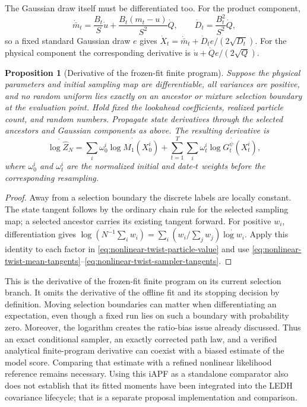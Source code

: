 \documentclass[11pt]{article}
\newtheorem{proposition}{Proposition}
\begin{document}
The Gaussian draw itself must be differentiated too. For the product component,
\begin{equation}
 \dot{\bar m}_t=\frac{B_t}{S}\dot u
                 +\frac{B_t(m_t-u)}{S^2}\dot Q,\qquad
 \dot D_t=\frac{B_t^2}{S^2}\dot Q,
 \label{eq:nonlinear-twist-sampler-tangents}
\end{equation}
so a fixed standard Gaussian draw $e$ gives
$\dot X_t=\dot{\bar m}_t+\dot D_t e/(2\sqrt{D_t})$.
For the physical component the corresponding derivative is
$\dot u+\dot Q e/(2\sqrt Q)$.

\begin{proposition}[Derivative of the frozen-fit finite program]
\label{prop:nonlinear-twist-finite-derivative}
Suppose the physical parameters and initial sampling map are differentiable,
all variances are positive, and no random uniform lies exactly on an ancestor
or mixture selection boundary at the evaluation point. Hold fixed the
lookahead coefficients, realized particle count, and random numbers. Propagate
state derivatives through the selected ancestors and Gaussian components as
above. The resulting derivative is
\begin{equation}
 \dot{\log\widehat Z_N}
  =\sum_i\omega_0^i\dot{\log M_1(X_0^i)}
   +\sum_{t=1}^T\sum_i\omega_t^i
                   \dot{\log G_t^\psi(X_t^i)},
 \label{eq:nonlinear-twist-finite-score}
\end{equation}
where $\omega_0^i$ and $\omega_t^i$ are the normalized initial and date-$t$
weights before the corresponding resampling.
\end{proposition}

\begin{proof}
Away from a selection boundary the discrete labels are locally constant.
The state tangent follows by the ordinary chain rule for the selected sampling
map; a selected ancestor carries its existing tangent forward. For positive
$w_i$, differentiation gives
$\dot{\log(N^{-1}\sum_i w_i)}=\sum_i
(w_i/\sum_jw_j)\dot{\log w_i}$. Apply this identity to each factor in
\eqref{eq:nonlinear-twist-particle-value} and use
\eqref{eq:nonlinear-twist-mean-tangents}--\eqref{eq:nonlinear-twist-sampler-tangents}.
\end{proof}

This is the derivative of the frozen-fit finite program on its current
selection branch. It omits the derivative of the offline fit and its stopping
decision by definition. Moving selection boundaries can matter when
differentiating an expectation, even though a fixed run lies on such a boundary
with probability zero. Moreover, the logarithm creates the ratio-bias issue
already discussed. Thus an exact conditional sampler, an exactly corrected
path law, and a verified analytical finite-program derivative can coexist with
a biased estimate of the model score. Comparing that estimate with a refined
nonlinear likelihood reference remains necessary. Using this iAPF as a
standalone comparator also does not establish that its fitted moments have
been integrated into the LEDH covariance lifecycle; that is a separate
proposal implementation and comparison.
\end{document}

